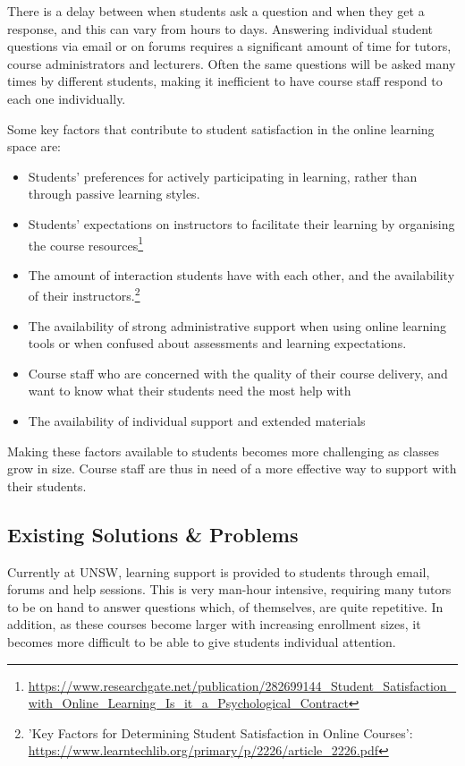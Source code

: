 \documentclass{article}
\begin{document}
There is a delay between when students ask a question and when they get a response, and this can vary from hours to days. Answering individual student questions via email or on forums requires a significant amount of time for tutors, course administrators and lecturers. Often the same questions will be asked many times by different students, making it inefficient to have course staff respond to each one individually.

Some key factors that contribute to student satisfaction in the online learning space are:
\begin{itemize}
  \item Students' preferences for actively participating in learning, rather than through passive learning styles.
  \item Students' expectations on instructors to facilitate their learning by organising the course resources\footnote{\url{https://www.researchgate.net/publication/282699144_Student_Satisfaction_with_Online_Learning_Is_it_a_Psychological_Contract}}
  \item The amount of interaction students have with each other, and the availability of their instructors.\footnote{'Key Factors for Determining Student Satisfaction in Online Courses': \url{https://www.learntechlib.org/primary/p/2226/article_2226.pdf}}
  \item The availability of strong administrative support when using online learning tools or when confused about assessments and learning expectations.
  \item Course staff who are concerned with the quality of their course delivery, and want to know what their students need the most help with
  \item The availability of individual support and extended materials
\end{itemize}

Making these factors available to students becomes more challenging as classes grow in size. Course staff are thus in need of a more effective way to support with their students. 

\subsection{Existing Solutions \& Problems}

Currently at UNSW, learning support is provided to students through email, forums and help sessions. This is very man-hour intensive, requiring many tutors to be on hand to answer questions which, of themselves, are quite repetitive. In addition, as these courses become larger with increasing enrollment sizes, it becomes more difficult to be able to give students individual attention.
\end{document}
